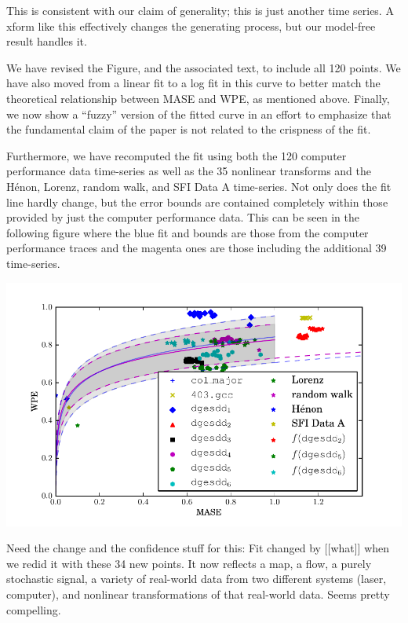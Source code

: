 \documentclass[12pt]{article}
\newcommand{\alert}[1]{{\color{red}#1}}
\begin{document}
This is consistent with our claim of generality; this is just another
time series.  A xform like this effectively changes the generating
process, but our model-free result handles it.

We have revised the Figure, and the associated text, to include all
120 points.  We have also moved from a linear fit to a log fit in this
curve to better match the theoretical relationship between MASE and
WPE, as mentioned above.  Finally, we now show a ``fuzzy'' version of
the fitted curve in an effort to emphasize that the fundamental claim
of the paper is not related to the crispness of the fit.

Furthermore, we have recomputed the fit using both the 120 computer performance
data time-series as well as the 35 nonlinear transforms and the H\'{e}non, Lorenz,
random walk, and SFI Data A time-series. Not only does the fit line hardly
change, but the error bounds are contained completely within those provided by
just the computer performance data. This can be seen in the following figure
where the blue fit and bounds are those from the computer performance traces and
the magenta ones are those including the additional 39 time-series.

\begin{center}
    \includegraphics[width=0.8\columnwidth]{figs/new_prediction_vs_entropy_extras_with_nonlinear_all_points}
\end{center}

\alert{Need the change and the confidence stuff for this: Fit changed
  by [[what]] when we redid it with these 34 new points.}  It now
reflects a map, a flow, a purely stochastic signal, a variety of
real-world data from two different systems (laser, computer), and
nonlinear transformations of that real-world data.  Seems pretty
compelling.
\end{document}
